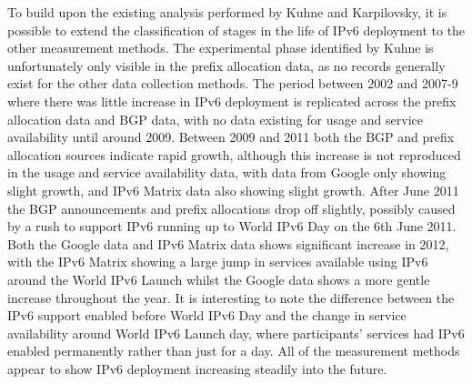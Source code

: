 To build upon the existing analysis performed by Kuhne and Karpilovsky, it is
possible to extend the classification of stages in the life of IPv6 deployment
to the other measurement methods. The experimental phase identified by Kuhne is
unfortunately only visible in the prefix allocation data, as no records
generally exist for the other data collection methods. The period between 2002
and 2007-9 where there was little increase in IPv6 deployment is replicated
across the prefix allocation data and BGP data, with no data existing for usage
and service availability until around 2009. Between 2009 and 2011 both the BGP
and prefix allocation sources indicate rapid growth, although this increase is
not reproduced in the usage and service availability data, with data from Google
only showing slight growth, and IPv6 Matrix data also showing slight growth.
After June 2011 the BGP announcements and prefix allocations drop off slightly,
possibly caused by a rush to support IPv6 running up to World IPv6 Day on the
6th June 2011. Both the Google data and IPv6 Matrix data shows significant
increase in 2012, with the IPv6 Matrix showing a large jump in services
available using IPv6 around the World IPv6 Launch whilst the Google data shows a
more gentle increase throughout the year. It is interesting to note the
difference between the IPv6 support enabled before World IPv6 Day and the change
in service availability around World IPv6 Launch day, where participants'
services had IPv6 enabled permanently rather than just for a day. All of the
measurement methods appear to show IPv6 deployment increasing steadily into the
future.





